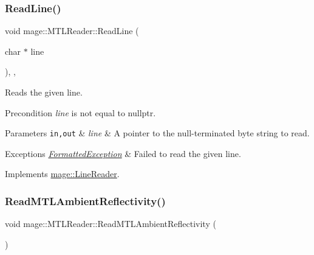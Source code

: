 \subsubsection{\texorpdfstring{Read\+Line()}{ReadLine()}}
{\footnotesize\ttfamily void mage\+::\+M\+T\+L\+Reader\+::\+Read\+Line (\begin{DoxyParamCaption}\item[{char $\ast$}]{line }\end{DoxyParamCaption})\hspace{0.3cm}{\ttfamily [override]}, {\ttfamily [private]}, {\ttfamily [virtual]}}

Reads the given line.

\begin{DoxyPrecond}{Precondition}
{\itshape line} is not equal to {\ttfamily nullptr}. 
\end{DoxyPrecond}

\begin{DoxyParams}[1]{Parameters}
\mbox{\tt in,out}  & {\em line} & A pointer to the null-\/terminated byte string to read. \\
\hline
\end{DoxyParams}

\begin{DoxyExceptions}{Exceptions}
{\em \hyperlink{structmage_1_1_formatted_exception}{Formatted\+Exception}} & Failed to read the given line. \\
\hline
\end{DoxyExceptions}


Implements \hyperlink{classmage_1_1_line_reader_acfb2f7279ec77d070a86d7db812d4745}{mage\+::\+Line\+Reader}.

\hypertarget{classmage_1_1_m_t_l_reader_a7137e998979a79fe258f226bfbda669e}{}\label{classmage_1_1_m_t_l_reader_a7137e998979a79fe258f226bfbda669e} 
\subsubsection{\texorpdfstring{Read\+M\+T\+L\+Ambient\+Reflectivity()}{ReadMTLAmbientReflectivity()}}
{\footnotesize\ttfamily void mage\+::\+M\+T\+L\+Reader\+::\+Read\+M\+T\+L\+Ambient\+Reflectivity (\begin{DoxyParamCaption}{ }\end{DoxyParamCaption})\hspace{0.3cm}{\ttfamily [private]}}

